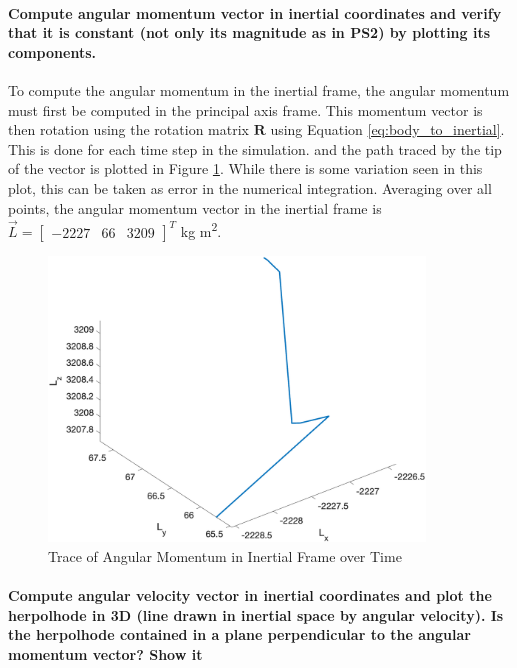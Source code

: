 \paragraph{Compute angular momentum vector in inertial coordinates and verify that it is constant (not only its magnitude as in PS2) by plotting its components.} To compute the angular momentum in the inertial frame, the angular momentum must first be computed in the principal axis frame. This momentum vector is then rotation using the rotation matrix $\boldsymbol{R}$ using Equation \ref{eq:body_to_inertial}. This is done for each time step in the simulation. and the path traced by the tip of the vector is plotted in Figure \ref{fig:angular_momentum_trace}. While there is some variation seen in this plot, this can be taken as error in the numerical integration. Averaging over all points, the angular momentum vector in the inertial frame is $\vec{L} = \begin{bmatrix} -2227 & 66 & 3209 \end{bmatrix}^T$ kg m\textsuperscript{2}. 

\begin{figure}[H]
    \centering
    \includegraphics[width = 10cm]{Images/angular_momentum_EA.png}
    \caption{Trace of Angular Momentum in Inertial Frame over Time}
    \label{fig:angular_momentum_trace}
\end{figure}

\paragraph{Compute angular velocity vector in inertial coordinates and plot the herpolhode in 3D (line drawn in inertial space by angular velocity). Is the herpolhode contained in a plane perpendicular to the angular momentum vector? Show it}

